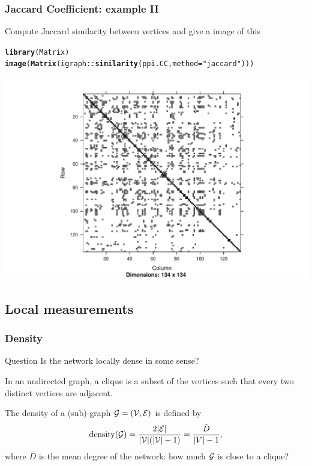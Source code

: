\documentclass{beamer}\usepackage[]{graphicx}\usepackage[]{color}
\makeatletter
\newcommand{\hlstr}[1]{\textcolor[rgb]{0.192,0.494,0.8}{#1}}%
\newcommand{\hlopt}[1]{\textcolor[rgb]{0,0,0}{#1}}%
\newcommand{\hlstd}[1]{\textcolor[rgb]{0.345,0.345,0.345}{#1}}%
\newcommand{\hlkwc}[1]{\textcolor[rgb]{0.333,0.667,0.333}{#1}}%
\newcommand{\hlkwd}[1]{\textcolor[rgb]{0.737,0.353,0.396}{\textbf{#1}}}%
\newenvironment{kframe}{%
 \def\at@end@of@kframe{}%
 \ifinner\ifhmode%
  \def\at@end@of@kframe{\end{minipage}}%
  \begin{minipage}{\columnwidth}%
 \fi\fi%
 \def\FrameCommand##1{\hskip\@totalleftmargin \hskip-\fboxsep
 \colorbox{shadecolor}{##1}\hskip-\fboxsep
     \hskip-\linewidth \hskip-\@totalleftmargin \hskip\columnwidth}%
 \MakeFramed {\advance\hsize-\width
   \@totalleftmargin\z@ \linewidth\hsize
   \@setminipage}}%
 {\par\unskip\endMakeFramed%
 \at@end@of@kframe}
\newenvironment{knitrout}{}{} %
\makeatother
\begin{document}
\begin{frame}[fragile]
  \frametitle{Jaccard Coefficient: example II}

Compute Jaccard similarity between vertices and give a image of this
\begin{knitrout}\scriptsize
{}\color{fgcolor}\begin{kframe}
\begin{alltt}
\hlkwd{library}\hlstd{(Matrix)}
\hlkwd{image}\hlstd{(}\hlkwd{Matrix}\hlstd{(igraph}\hlopt{::}\hlkwd{similarity}\hlstd{(ppi.CC,} \hlkwc{method} \hlstd{=} \hlstr{"jaccard"}\hlstd{)))}
\end{alltt}
\end{kframe}
\includegraphics[width=.8\textwidth]{figures/jaccardplot-1} 

\end{knitrout}

\end{frame}

\subsection{Local measurements}

\begin{frame}
  \frametitle{Density}

  \begin{block}{Question}
    Is the network locally \alert{dense} in some sense?
  \end{block}

  \begin{definition}[Clique]
    In an undirected graph, a clique is a subset of the vertices such that \alert{every two distinct vertices are adjacent}.
  \end{definition}


  \begin{definition}[Density]
    The density of a (sub)-graph $\mathcal{G} = (\mathcal{V},\mathcal{E})$ is defined by
    \[
      \mathrm{density}(\mathcal{G}) = \frac{2|\mathcal{E}|}{|\mathcal{V}|(|\mathcal{V}| - 1)} = \frac{\bar{D}}{|V|-1},
    \]
    where $\bar{D}$ is the mean degree of the network: how much $\mathcal{G}$ is close to a clique? 
  \end{definition}

\end{frame}
\end{document}
